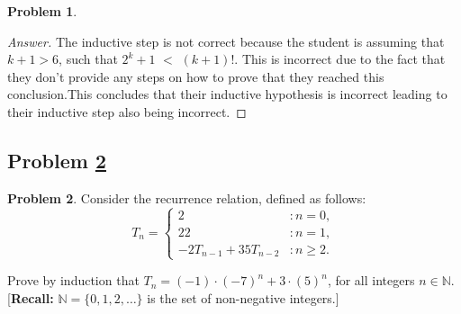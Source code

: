 \documentclass[11pt]{article}
\theoremstyle{definition}
\theoremstyle{definition}
\newtheorem{required}{Problem}
\theoremstyle{definition}
\begin{document}
\begin{required}
\begin{enumerate}[label=(\alph*)]
\begin{proof}[Answer]
The inductive step is not correct because the student is assuming that $k + 1 > 6$, such that $2^k+1$ $<$ $(k+1)!$. This is incorrect due to the fact that they don't provide any steps on how to prove that they reached this conclusion.This concludes that their inductive hypothesis is incorrect leading to their inductive step also being incorrect.
\end{proof}
\end{enumerate}
\end{required}





\newpage
\subsection{Problem \ref{Induction2}} 
\begin{required} \label{Induction2}
Consider the recurrence relation, defined as follows:
\[
T_{n} = \begin{cases} 2 & : n = 0, \\
22 & : n = 1, \\
-2 T_{n-1} + 35 T_{n-2} & : n \geq 2.
\end{cases}
\]

\noindent Prove by induction that $T_{n} = (-1) \cdot (-7)^{n} + 3 \cdot (5)^{n}$, for all integers $n \in \mathbb{N}$. [\textbf{Recall:} $\mathbb{N} = \{0, 1, 2, \ldots \}$ is the set of non-negative integers.]
\end{required}
\end{document}
